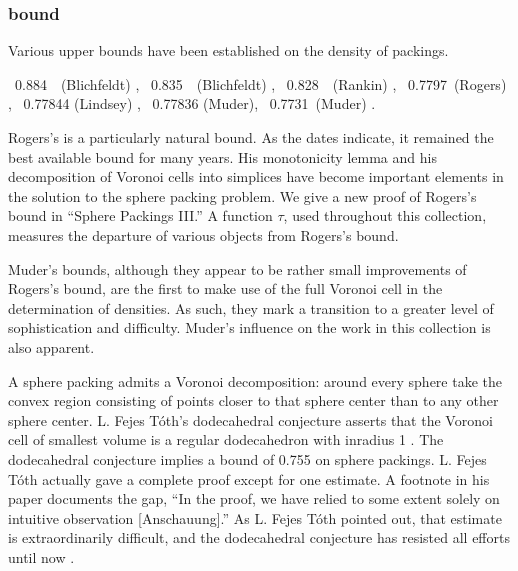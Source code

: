 \subsubsection{bound}

Various upper bounds have been established on the density of
packings.
\smallskip

{\obeylines

 \ 0.884\ \ (Blichfeldt) \cite{Bli19},
 \ 0.835\ \ (Blichfeldt) \cite{Bli29},
 \ 0.828\ \ (Rankin) \cite{Ran47},
 \ 0.7797\ (Rogers) \cite{Rog58},
 \ 0.77844 (Lindsey) \cite{Lin86},
 \ 0.77836 (Muder)\cite{Mud88},
 \ 0.7731\ (Muder) \cite{Mud93}.

}

\smallskip
Rogers's is a particularly natural bound.
  As the dates indicate, it remained the best available
bound for many years.  His monotonicity lemma and his
decomposition of Voronoi cells into simplices have become important
elements in the solution to the sphere packing problem.
We give a new proof of Rogers's bound
in ``Sphere Packings III.''  A function $\tau$,
used throughout this
collection, measures the departure of various objects from
Rogers's bound.

Muder's bounds, although they appear to be rather small
improvements of Rogers's bound, are the first to make use of the
full Voronoi cell in the determination of densities. As such, they
mark a transition to a greater level of sophistication and
difficulty.  Muder's influence on the work in this collection is
also apparent.

A sphere packing admits a Voronoi decomposition: around
every sphere take the convex region consisting of points closer to that sphere
center than to any other sphere center.   L. Fejes T\'oth's
dodecahedral
conjecture asserts that the Voronoi cell of smallest volume is
a regular dodecahedron with inradius 1 \cite{Fej42}.
The dodecahedral conjecture implies a bound of 0.755 on sphere
packings.  L. Fejes T\'oth actually gave a complete proof except
for one estimate. A footnote in his paper documents the gap, ``In the
proof, we have relied to some extent solely on intuitive
observation [Anschauung].''
 As L. Fejes T\'oth pointed out, that estimate is extraordinarily
difficult, and the dodecahedral conjecture has resisted all efforts
until now \cite{McL98}.

